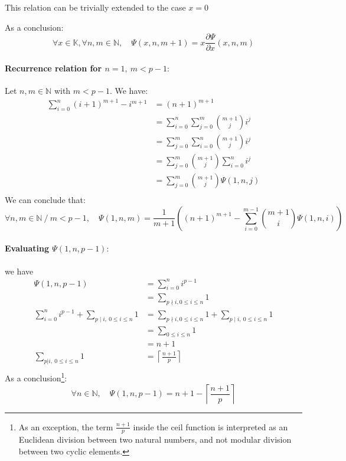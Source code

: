 \documentclass[]{article}
\begin{document}
This relation can be trivially extended to the case $x=0$

As a conclusion:
$$
\boxed{\forall x \in\mathbb{K},\forall n,m\in\mathbb{N},\quad \Psi(x,n,m+1)=x\frac{\partial \Psi}{\partial x}(x,n,m)}
$$


\paragraph{Recurrence relation for $n=1,\ m<p-1: $} Let $n,m\in\mathbb{N}$ with $m<p-1.$ We have:
\begin{align*}
	\sum_{i=0}^{n}(i+1)^{m+1}-i^{m+1}&=(n+1)^{m+1}\\
	&=\sum_{i=0}^{n}\sum_{j=0}^{m} {m+1 \choose j}i^j\\
	&=\sum_{j=0}^{m}\sum_{i=0}^{n} {m+1 \choose j}i^j\\
	&=\sum_{j=0}^{m}{m+1 \choose j}\sum_{i=0}^{n} i^j\\
	&=\sum_{j=0}^m{m+1 \choose j}\Psi(1,n,j)\\
\end{align*}
We can conclude that:
$$
\boxed{\forall n,m\in\mathbb{N}\ /\ m<p-1,\quad\Psi(1,n,m)=\frac{1}{m+1}\left((n+1)^{m+1}-\sum_{i=0}^{m-1}{m+1 \choose i}\Psi(1,n,i)\right)}
$$

\paragraph{Evaluating $\Psi(1,n,p-1): $} we have
\begin{align*}
	\Psi(1,n,p-1)&= \sum_{i=0}^ni^{p-1}\\
	&= \sum_{p \nmid i,0\leq i \leq n} 1\\
	\sum_{i=0}^ni^{p-1}+\sum_{p\mid i, \ 0\leq i\leq n}1
	&=\sum_{p \nmid i,0\leq i \leq n} 1+ \sum_{p\mid i, \ 0\leq i\leq n}1\\
	&=\sum_{0\leq i \leq n} 1 \\
	&=n+1\\
	\sum_{p|i, \ 0\leq i\leq n}1&=\left\lceil\frac{n+1}{p}\right\rceil \\
\end{align*}
 As a conclusion\footnote{As an exception, the term $\frac{n+1}{p}$ inside the ceil function is interpreted as an Euclidean division between two natural numbers, and not modular division between two cyclic elements.}:
 $$
 \boxed{\forall n\in\mathbb{N},\quad \Psi(1,n,p-1) =n+1 -\left\lceil\frac{n+1}{p}\right\rceil}
 $$
\end{document}
